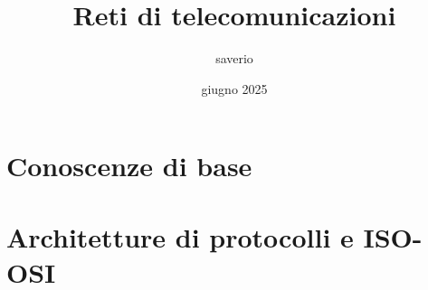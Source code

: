 \documentclass{report}
\title{Reti di telecomunicazioni}
\author{saverio}
\date{giugno 2025}
\begin{document}
\maketitle
\tableofcontents


\chapter{Conoscenze di base}



\chapter{Architetture di protocolli e ISO-OSI}

\end{document}
